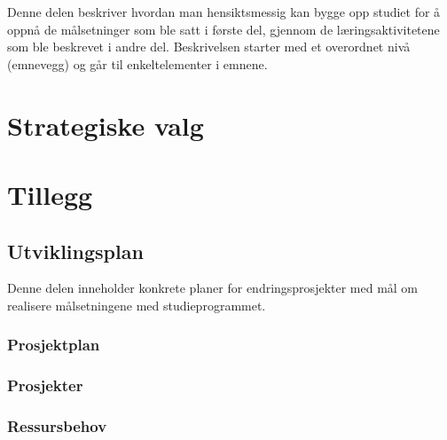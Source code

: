 \documentclass[a4paper, oneside, 12pt]{memoir}
\begin{document}
Denne delen beskriver hvordan man hensiktsmessig kan bygge opp studiet for å oppnå de målsetninger som ble satt i første del, gjennom de læringsaktivitetene som ble beskrevet i andre del. Beskrivelsen starter med et overordnet nivå (emnevegg) og går til enkeltelementer i emnene.

\part{Strategiske valg}

\appendix

\renewcommand{\appendixtocname}{Tillegg}
\renewcommand{\appendixpagename}{Tillegg}
\part*{Tillegg}

\chapter{Utviklingsplan}

Denne delen inneholder konkrete planer for endringsprosjekter med mål om realisere målsetningene med studieprogrammet.

\section{Prosjektplan}

\section{Prosjekter}

	


	





\section{Ressursbehov}
\end{document}
